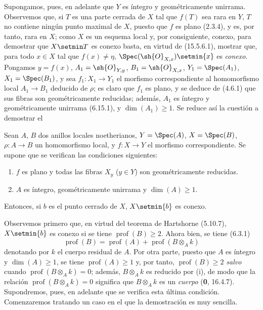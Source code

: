\begin{env}[18.9.7.2]
\label{IV.18.9.7.2}
Supongamos, pues, en adelante que $Y$ es íntegro y geométricamente unirrama. Observemos que, si $T$ es una parte cerrada de $X$ tal que $f(T)$ sea rara en $Y$, $T$ no contiene ningún punto maximal de $X$, puesto que $f$ es plano (2.3.4), y es, por tanto, rara en $X$; como $X$ es un esquema local y, por consiguiente, conexo, para demostrar que $X\setmin T$ es conexo basta, en virtud de (15.5.6.1), mostrar que, para todo $x\in X$ tal que $f(x)\neq\eta$, $\Spec(\sh{O}_{X,x})\setmin\{x\}$ es \emph{conexo}. Pongamos $y=f(x)$, $A_1=\sh{O}_{Y,y}$, $B_1=\sh{O}_{X,x}$, $Y_1=\Spec(A_1)$, $X_1=\Spec(B_1)$, y sea $f_1:X_1\to Y_1$ el morfismo correspondiente al homomorfismo local $A_1\to B_1$ deducido de $\rho$; es claro que $f_1$ es plano, y se deduce de (4.6.1) que sus fibras son geométricamente reducidas; además, $A_1$ es íntegro y geométricamente unirrama (6.15.1), y $\dim(A_1)\geq 1$. Se reduce así la cuestión a demostrar el
\end{env}

\begin{lemma}[18.9.7.3]
\label{IV.18.9.7.3}
Sean $A$, $B$ dos anillos locales noetherianos, $Y=\Spec(A)$, $X=\Spec(B)$, $\rho:A\to B$ un homomorfismo local, y $f:X\to Y$ el morfismo correspondiente. Se supone que se verifican las condiciones siguientes:
\begin{enumerate}
  \item[\textup{(i)}] $f$ es plano y todas las fibras $X_y$ \textup{(}$y\in Y$\textup{)} son geométricamente reducidas.
  \item[\textup{(ii)}] $A$ es íntegro, geométricamente unirrama y $\dim(A)\geq 1$.
\end{enumerate}
Entonces, si $b$ es el punto cerrado de $X$, $X\setmin\{b\}$ es conexo.
\end{lemma}

Observemos primero que, en virtud del teorema de Hartshorne (5.10.7), $X\setmin\{b\}$ es conexo si se tiene $\operatorname{prof}(B)\geq 2$. Ahora bien, se tiene (6.3.1)
\begin{equation}
  \operatorname{prof}(B)=\operatorname{prof}(A)+\operatorname{prof}(B\otimes_A k)
  \tag{18.9.7.4}
  \label{IV.18.9.7.4}
\end{equation}
denotando por $k$ el cuerpo residual de $A$. Por otra parte, puesto que $A$ es íntegro y $\dim(A)\geq 1$, se tiene $\operatorname{prof}(A)\geq 1$ y, por tanto, $\operatorname{prof}(B)\geq 2$ \emph{salvo} cuando $\operatorname{prof}(B\otimes_A k)=0$; además, $B\otimes_A k$ es reducido por (i), de modo que la relación $\operatorname{prof}(B\otimes_A k)=0$ significa que $B\otimes_A k$ es un \emph{cuerpo} (\textbf 0, 16.4.7). Supondremos, pues, en adelante que se verifica esta última condición. Comenzaremos tratando un caso en el que la demostración es muy sencilla.

